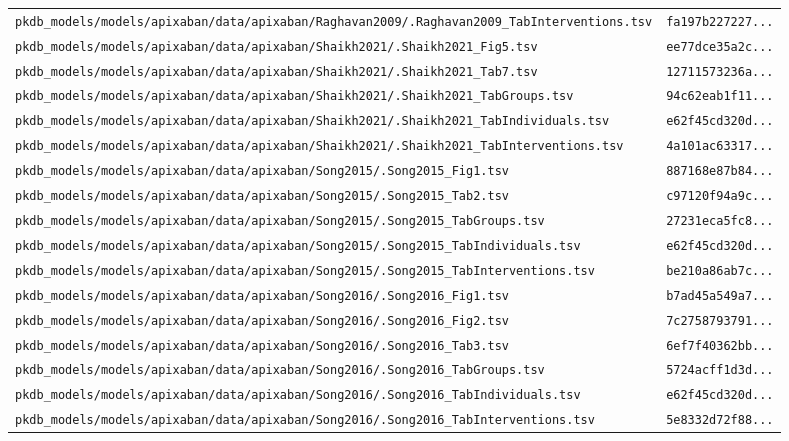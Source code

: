 \documentclass{article}
\begin{document}
\begin{longtable}{ll}
\texttt{pkdb\_models/models/apixaban/data/apixaban/Raghavan2009/.Raghavan2009\_TabInterventions.tsv} & \texttt{fa197b227227...} \\
\texttt{pkdb\_models/models/apixaban/data/apixaban/Shaikh2021/.Shaikh2021\_Fig5.tsv} & \texttt{ee77dce35a2c...} \\
\texttt{pkdb\_models/models/apixaban/data/apixaban/Shaikh2021/.Shaikh2021\_Tab7.tsv} & \texttt{12711573236a...} \\
\texttt{pkdb\_models/models/apixaban/data/apixaban/Shaikh2021/.Shaikh2021\_TabGroups.tsv} & \texttt{94c62eab1f11...} \\
\texttt{pkdb\_models/models/apixaban/data/apixaban/Shaikh2021/.Shaikh2021\_TabIndividuals.tsv} & \texttt{e62f45cd320d...} \\
\texttt{pkdb\_models/models/apixaban/data/apixaban/Shaikh2021/.Shaikh2021\_TabInterventions.tsv} & \texttt{4a101ac63317...} \\
\texttt{pkdb\_models/models/apixaban/data/apixaban/Song2015/.Song2015\_Fig1.tsv} & \texttt{887168e87b84...} \\
\texttt{pkdb\_models/models/apixaban/data/apixaban/Song2015/.Song2015\_Tab2.tsv} & \texttt{c97120f94a9c...} \\
\texttt{pkdb\_models/models/apixaban/data/apixaban/Song2015/.Song2015\_TabGroups.tsv} & \texttt{27231eca5fc8...} \\
\texttt{pkdb\_models/models/apixaban/data/apixaban/Song2015/.Song2015\_TabIndividuals.tsv} & \texttt{e62f45cd320d...} \\
\texttt{pkdb\_models/models/apixaban/data/apixaban/Song2015/.Song2015\_TabInterventions.tsv} & \texttt{be210a86ab7c...} \\
\texttt{pkdb\_models/models/apixaban/data/apixaban/Song2016/.Song2016\_Fig1.tsv} & \texttt{b7ad45a549a7...} \\
\texttt{pkdb\_models/models/apixaban/data/apixaban/Song2016/.Song2016\_Fig2.tsv} & \texttt{7c2758793791...} \\
\texttt{pkdb\_models/models/apixaban/data/apixaban/Song2016/.Song2016\_Tab3.tsv} & \texttt{6ef7f40362bb...} \\
\texttt{pkdb\_models/models/apixaban/data/apixaban/Song2016/.Song2016\_TabGroups.tsv} & \texttt{5724acff1d3d...} \\
\texttt{pkdb\_models/models/apixaban/data/apixaban/Song2016/.Song2016\_TabIndividuals.tsv} & \texttt{e62f45cd320d...} \\
\texttt{pkdb\_models/models/apixaban/data/apixaban/Song2016/.Song2016\_TabInterventions.tsv} & \texttt{5e8332d72f88...} \\

\end{longtable}
\end{document}
